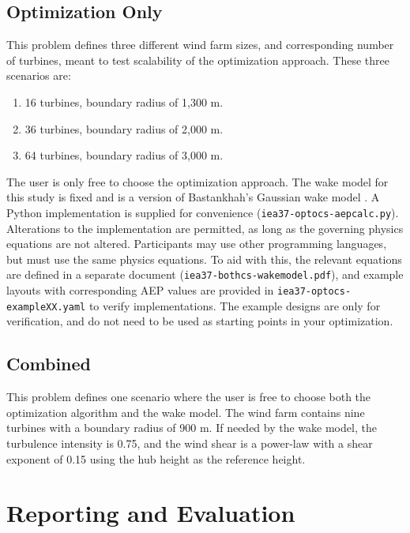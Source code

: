 \documentclass{article}
\begin{document}
    \subsection{Optimization Only}

        This problem defines three different wind farm sizes, and corresponding number of turbines, meant to test scalability of the optimization approach.  These three scenarios are:
        \begin{enumerate}
            \item 16 turbines, boundary radius of 1,300 m.
            \item 36 turbines, boundary radius of 2,000 m.
            \item 64 turbines, boundary radius of 3,000 m.
        \end{enumerate}

        The user is only free to choose the optimization approach.  The wake model for this study is fixed and is a version of Bastankhah's Gaussian wake model \cite{Thomas2018, Bastankhah2014, Bastankhah2016}.  A Python implementation is supplied for convenience (\texttt{iea37-optocs-aepcalc.py}). Alterations to the implementation are permitted, as long as the governing physics equations are not altered.  Participants may use other programming languages, but must use the same physics equations.  To aid with this, the relevant equations are defined in a separate document (\texttt{iea37-bothcs-wakemodel.pdf}), and example layouts with corresponding AEP values are provided in \texttt{iea37-optocs-exampleXX.yaml} to verify implementations.  The example designs are only for verification, and do not need to be used as starting points in your optimization.  

    \subsection{Combined}

        This problem defines one scenario where the user is free to choose both the optimization algorithm and the wake model.  The wind farm contains nine turbines with a boundary radius of 900 m.  If needed by the wake model, the turbulence intensity is 0.75, and the wind shear is a power-law with a shear exponent of 0.15 using the hub height as the reference height.

\section{Reporting and Evaluation}
\end{document}
